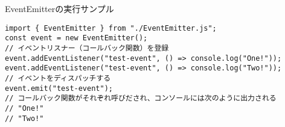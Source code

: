 \begin{listtitle}
EventEmitterの実行サンプル
\end{listtitle}
\begin{lstlisting}
import { EventEmitter } from "./EventEmitter.js";
const event = new EventEmitter();
// イベントリスナー（コールバック関数）を登録
event.addEventListener("test-event", () => console.log("One!"));
event.addEventListener("test-event", () => console.log("Two!"));
// イベントをディスパッチする
event.emit("test-event");
// コールバック関数がそれぞれ呼びだされ、コンソールには次のように出力される
// "One!"
// "Two!"
\end{lstlisting}
\listend
